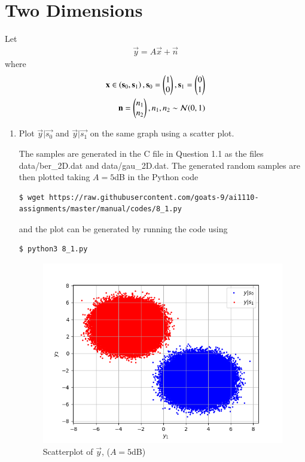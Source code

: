 \documentclass[journal,12pt,twocolumn]{IEEEtran}
\renewcommand\thesection{\arabic{section}}
\begin{document}
\section{Two Dimensions}
\noindent Let 
\begin{align}
	\vec{y} = A\vec{x} + \vec{n}
\end{align}
where 
\begin{align}
	\mathbf{x} \in \left(\mathbf{s}_0, \mathbf{s}_1\right), \mathbf{s}_0 = \begin{pmatrix}1 \\ 0\end{pmatrix}, \mathbf{s}_1 = \begin{pmatrix}0 \\ 1\end{pmatrix} \\
	\mathbf{n} = \begin{pmatrix}n_1 \\ n_2\end{pmatrix}, n_1, n_2 \sim \mathcal{N}(0, 1)
\end{align}
\begin{enumerate}[label=\thesection.\arabic*
,ref=\thesection.\theenumi]
\item Plot $\vec{y}|\vec{s_0}$ and $\vec{y}|\vec{s_1}$ on the same graph using a scatter plot.

\solution
The samples are generated in the C file in Question 1.1 as the files data/ber\_2D.dat and data/gau\_2D.dat. The generated random samples are then plotted taking $A = 5$dB in the Python code
\begin{lstlisting}
$ wget https://raw.githubusercontent.com/goats-9/ai1110-assignments/master/manual/codes/8_1.py
\end{lstlisting}
and the plot can be generated by running the code using
\begin{lstlisting}
$ python3 8_1.py
\end{lstlisting}
\begin{figure}
	\includegraphics[width=\columnwidth]{figs/8_1.png}
	\caption{Scatterplot of $\vec{y}$, ($A = 5$dB)}
	\label{eq:y-scat-2D}
\end{figure}


\end{enumerate}
\end{document}

